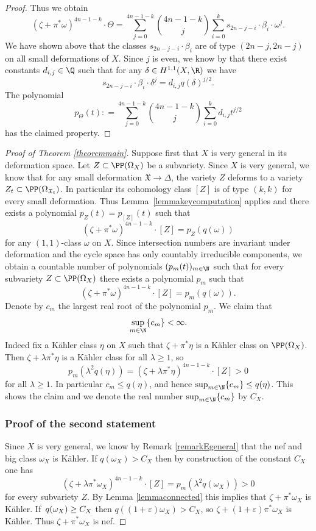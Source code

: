 \begin{proof}
Thus we obtain
\[
(\zeta+\pi^*\omega)^{4n-1-k} \cdot \Theta
=
\sum_{j=0}^{4n-1-k}
\binom{4n-1-k}{j}
\sum_{i=0}^{k} s_{2n-j-i} \cdot \beta_{i} \cdot \omega^j
.
\]
We have shown above that the classes $s_{2n-j-i} \cdot \beta_{i}$
are of type $(2n-j, 2n-j)$ on all small deformations of $X$.
Since $j$ is even, we know by \cite[Th.\,5.12]{Huy97} that there exist
constants $d_{i,j} \in \Q$ such that for any
$\delta\in H^{1,1}(X,\R)$ we have
\[
s_{2n-j-i} \cdot \beta_{i} \cdot \delta^j = d_{i,j} q(\delta)^{j/2}.
\]
The polynomial
\[
p_\Theta(t): = \sum_{j=0}^{4n-1-k}
\binom{4n-1-k}{j}
\sum_{i=0}^{k} d_{i,j} t^{j/2}
\]
has the claimed property.
\end{proof}

\begin{proof}[Proof of Theorem \ref{theoremmain}]
Suppose first that $X$ is very general in its deformation space.
Let $Z \subset \PP(\Omega_X)$ be a subvariety.
Since $X$ is very general, we know that
for any small deformation $\mathfrak X \to \Delta$, the variety $Z$ deforms
to a variety $Z_t \subset \PP(\Omega_{\mathfrak X_t})$.
In particular its cohomology class $[Z]$ is of type $(k,k)$ for every small deformation.
Thus Lemma~\ref{lemmakeycomputation} applies and there exists a polynomial $p_Z(t)=p_{[Z]}(t)$ such that
\[
(\zeta + \pi^* \omega)^{4n-1-k} \cdot [Z] = p_Z(q(\omega))
\]
for any $(1,1)$-class $\omega$ on $X$. Since intersection numbers are invariant under deformation and the cycle space
has only countably irreducible components, we obtain a countable number of polynomials
$(p_m(t))_{m \in \N}$ such that for every subvariety $Z \subset \PP(\Omega_X)$ there exists a polynomial $p_m$
such that
\[
(\zeta + \pi^* \omega)^{4n-1-k} \cdot [Z] = p_m(q(\omega)).
\]
Denote by $c_m$ the largest real root of the polynomial $p_m$. We claim that
\[
\sup_{m \in \N} \{ c_m \} < \infty.
\]
Indeed fix a Kähler class $\eta$ on $X$ such that $\zeta+\pi^*\eta$ is a Kähler class on $\PP(\Omega_X)$. Then $\zeta+ \lambda \pi^*\eta$ is a Kähler class for all $\lambda \geq 1$, so
\[
p_m(\lambda^2 q(\eta)) = (\zeta + \lambda \pi^* \eta)^{4n-1-k} \cdot [Z] > 0
\]
for all $\lambda \geq 1$. In particular $c_m \leq q(\eta)$, and hence $\sup_{m \in \N} \{ c_m \} \leq q(\eta)$.
This shows the claim and we denote the real number $\sup_{m \in \N} \{ c_m \}$ by $C_X$.

\subsubsection*{Proof of the second statement}
Since $X$ is very general, we know by Remark \ref{remarkEgeneral} that the nef and big class $\omega_X$ is Kähler.
If $q(\omega_X) > C_X$ then by construction of the constant $C_X$ one has
\[
(\zeta + \lambda \pi^* \omega_X)^{4n-1-k} \cdot [Z] = p_m(\lambda^2 q(\omega_X)) > 0
\]
for every subvariety $Z$. By Lemma \ref{lemmaconnected} this implies that $\zeta+\pi^* \omega_X$ is Kähler.
If~$q(\omega_X) \geq\nobreak C_X$ then $q((1+\varepsilon) \omega_X) > C_X$, so $\zeta+(1+\varepsilon) \pi^* \omega_X$ is Kähler.
Thus $\zeta+\pi^* \omega_X$ is nef.


\end{proof}
